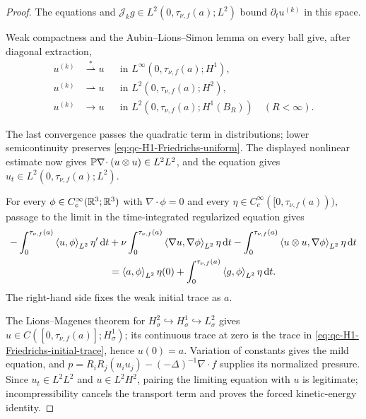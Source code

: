 \begin{proof}
The equations and \(\mathcal J_kg\in L^2(0,\tau_{\nu,f}(a);L^2)\) bound
\(\partial_tu^{(k)}\) in this space.
\begin{samepage}
Weak compactness and the
Aubin--Lions--Simon lemma \cite{Aubin1963,Simon1987} on every ball give, after diagonal
extraction,
\begin{align*}
 u^{(k)}&\stackrel{*}{\rightharpoonup} u
 &&\text{in }L^\infty(0,\tau_{\nu,f}(a);H^1),\\
 u^{(k)}&\rightharpoonup u
 &&\text{in }L^2(0,\tau_{\nu,f}(a);H^2),\\
 u^{(k)}&\longrightarrow u
 &&\text{in }L^2(0,\tau_{\nu,f}(a);H^1(B_R))
 \quad(R<\infty).
\end{align*}
\par
\end{samepage}
The last convergence passes the quadratic term in distributions; lower
semicontinuity preserves \eqref{eq:qc-H1-Friedrichs-uniform}.  The displayed
nonlinear estimate now gives
\(\mathbb P\nabla\!\cdot(u\otimes u)\in L^2L^2\), and the equation gives
\(u_t\in L^2(0,\tau_{\nu,f}(a);L^2)\).
\begin{samepage}
For every
\(\phi\in C_c^\infty(\mathbb R^3;\mathbb R^3)\) with \(\nabla\cdot\phi=0\) and every
\(\eta\in C_c^\infty([0,\tau_{\nu,f}(a)))\), passage to the limit in the
time-integrated regularized equation gives
\begin{align}
 -\int_0^{\tau_{\nu,f}(a)}\left\langle u,\phi\right\rangle_{L^2}\eta'\,\mathrm d t
 &+\nu\int_0^{\tau_{\nu,f}(a)}\left\langle \nabla u,\nabla\phi\right\rangle_{L^2}\eta\,\mathrm d t
 -\int_0^{\tau_{\nu,f}(a)}\left\langle u\otimes u,\nabla\phi\right\rangle_{L^2}\eta\,\mathrm d t
 \notag\\
 &=\left\langle a,\phi\right\rangle_{L^2}\eta(0)
 +\int_0^{\tau_{\nu,f}(a)}\left\langle g,\phi\right\rangle_{L^2}\eta\,\mathrm d t.
 \label{eq:qc-H1-Friedrichs-initial-trace}
\end{align}
The right-hand side fixes the weak initial trace as \(a\).
\par
\end{samepage}
The Lions--Magenes theorem \cite{LionsMagenes1972} for
\(H^2_\sigma\hookrightarrow H^1_\sigma\hookrightarrow L^2_\sigma\)
gives \(u\in C([0,\tau_{\nu,f}(a)];H^1_\sigma)\); its continuous trace at zero is
the trace in \eqref{eq:qc-H1-Friedrichs-initial-trace}, hence \(u(0)=a\).
Variation of constants gives the mild equation, and
\(p=R_iR_j(u_i u_j)-(-\Delta)^{-1}\nabla\cdot f\) supplies its normalized
pressure.  Since
\(u_t\in L^2L^2\) and \(u\in L^2H^2\), pairing the limiting equation with
\(u\) is legitimate; incompressibility cancels the transport term and proves
the forced kinetic-energy identity.


\end{proof}
